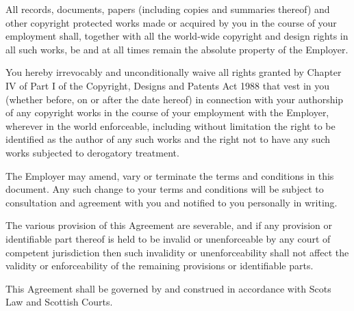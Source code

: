 \documentclass[a4paper,11pt,onecolumn ]{article}
\begin{document}
\begin{legal}
\item {}
\begin{legal}
\item All records, documents, papers (including copies and summaries thereof) and
other copyright protected works made or acquired by you in the course of
your employment shall, together with all the world-wide copyright and design
rights in all such works, be and at all times remain the absolute property of
the Employer.
\item You hereby irrevocably and unconditionally waive all rights granted by
Chapter IV of Part I of the Copyright, Designs and Patents Act 1988 that vest in
you (whether before, on or after the date hereof) in connection with your
authorship of any copyright works in the course of your employment with the
Employer, wherever in the world enforceable, including without limitation the
right to be identified as the author of any such works and the right not to have
any such works subjected to derogatory treatment.
\end{legal}

\item {}
The Employer may amend, vary or terminate the terms and conditions in this
document. Any such change to your
terms and conditions will be subject to consultation and agreement with you and
notified to you personally in writing.

\item {}
The various provision of this Agreement are severable, and if any provision or
identifiable part thereof is held to be invalid or unenforceable by any court of
competent jurisdiction then such invalidity or unenforceability shall not affect the
validity or enforceability of the remaining provisions or identifiable parts.

\item {}
This Agreement shall be governed by and construed in accordance with Scots Law
and Scottish Courts.
\end{legal}

\newpage
\end{document}
